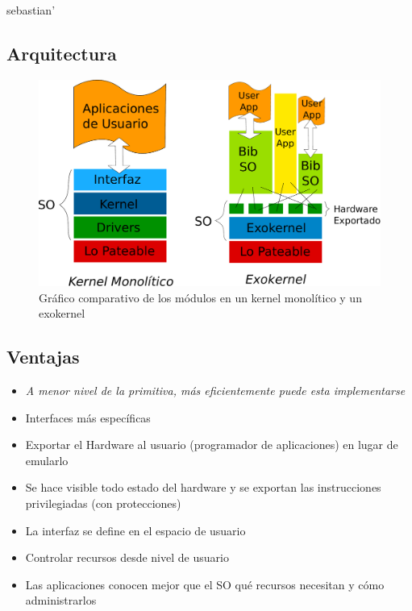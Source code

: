 sebastian'\]\documentclass[10pt]{beamer}
\begin{document}
\subsection{Arquitectura}
\begin{frame}
\begin{figure}[H]
\centering
\includegraphics[scale=0.3]{grafico-kernel-exokernel.pdf}
\caption{Gráfico comparativo de los módulos en un kernel monolítico y un exokernel}
\end{figure}
\end{frame}

\subsection{Ventajas}
\begin{frame}
\begin{itemize}
  \item \emph{A menor nivel de la primitiva, más eficientemente puede esta implementarse}
  \item Interfaces más específicas
  \item Exportar el Hardware al usuario (programador de aplicaciones) en lugar de emularlo
  \item Se hace visible todo estado del hardware y se exportan las instrucciones privilegiadas (con protecciones)
  \item La interfaz se define en el espacio de usuario
  \item Controlar recursos desde nivel de usuario
  \item Las aplicaciones conocen mejor que el SO qué recursos necesitan y cómo administrarlos
\end{itemize}
\end{frame}
\end{document}
